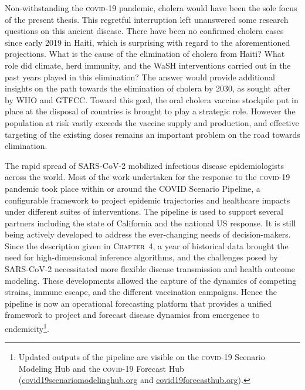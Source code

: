 Non-withstanding the \textsc{covid}-19 pandemic, cholera would have been the sole focus of the present thesis. This regretful interruption left unanswered some research questions on this ancient disease. There have been no confirmed cholera cases since early 2019 in Haiti, which is surprising with regard to the aforementioned projections. What is the cause of the elimination of cholera from Haiti? What role did climate, herd immunity, and the WaSH interventions carried out in the past years played\cite{Rebaudet:CaseareaTargetedRapid:2019} in this elimination? The answer would provide additional insights on the path towards the elimination of cholera by 2030, as sought after by WHO and GTFCC. Toward this goal, the oral cholera vaccine stockpile put in place at the disposal of countries is brought to play a strategic role\cite{GlobalTaskForceonCholeraControl:EndingCholeraGlobal:2017}. However the population at risk vastly exceeds the vaccine supply and production\cite{Pezzoli:GlobalOralCholera:2019}, and effective targeting of the existing doses remains an important problem\cite{Lessler:MappingBurdenCholera:2018} on the road towards elimination.

The rapid spread of SARS-CoV-2 mobilized infectious disease epidemiologists across the world. Most of the work undertaken for the response to the \textsc{covid}-19 pandemic took place within or around the COVID Scenario Pipeline, a configurable framework to project epidemic trajectories and healthcare impacts under different suites of interventions. The pipeline is used to support several partners including the state of California and the national US response. It is still being actively developed to address the ever-changing needs of decision-makers. Since the description given in \textsc{Chapter~4}, a year of historical data brought the need for high-dimensional inference algorithms, and the challenges posed by SARS-CoV-2 necessitated more flexible disease transmission and health outcome modeling. These developments allowed the capture of the dynamics of competing strains, immune escape, and the different vaccination campaigns\cite{Borchering:ModelingFutureCOVID19:2021}. Hence the pipeline is now an operational forecasting platform that provides a unified framework to project and forecast disease dynamics from emergence to endemicity\footnote{Updated outputs of the pipeline are visible on the \textsc{covid}-19 Scenario Modeling Hub and the \textsc{covid}-19 Forecast Hub (\url{covid19scenariomodelinghub.org} and \url{covid19forecasthub.org}).}.


